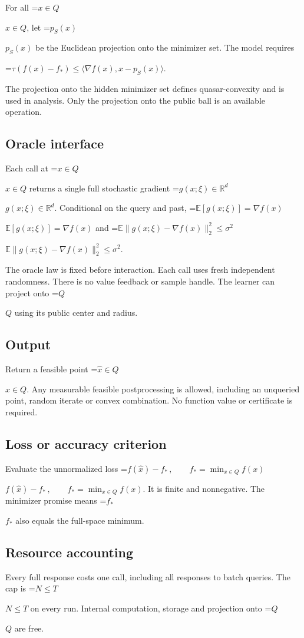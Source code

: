 \documentclass[10pt,a4paper]{article}
\newcommand{\AtlasMath}[1]{\par\begingroup\centering\setbox0=\hbox{$\displaystyle #1$}\ifdim\wd0>1.4\linewidth\typeout{ATLAS WIDE FORMULA: \the\wd0}\fi\ifdim\wd0>\linewidth\resizebox{\linewidth}{!}{\box0}\else\box0\fi\par\endgroup}
\newcommand{\AtlasInlineMath}[1]{\begingroup\setbox0=\hbox{$#1$}\ifdim\wd0>.4\linewidth\endgroup\AtlasMath{#1}\else\endgroup$#1$\fi}
\begin{document}
For all \AtlasInlineMath{x\in Q}, let \AtlasInlineMath{p_S(x)} be the Euclidean projection onto the minimizer set. The model requires


\AtlasMath{\tau(f(x)-f_*)\le \langle\nabla f(x),x-p_S(x)\rangle.}


The projection onto the hidden minimizer set defines quasar-convexity and is used in analysis. Only the projection onto the public ball is an available operation.

\subsection{Oracle interface}
Each call at \AtlasInlineMath{x\in Q} returns a single full stochastic gradient \AtlasInlineMath{g(x;\xi)\in\mathbb R^d}. Conditional on the query and past, \AtlasInlineMath{\mathbb E[g(x;\xi)]=\nabla f(x)} and \AtlasInlineMath{\mathbb E\|g(x;\xi)-\nabla f(x)\|_2^2\le\sigma^2}.

The oracle law is fixed before interaction. Each call uses fresh independent randomness. There is no value feedback or sample handle. The learner can project onto \AtlasInlineMath{Q} using its public center and radius.

\subsection{Output}
Return a feasible point \AtlasInlineMath{\widehat x\in Q}. Any measurable feasible postprocessing is allowed, including an unqueried point, random iterate or convex combination. No function value or certificate is required.

\subsection{Loss or accuracy criterion}
Evaluate the unnormalized loss \AtlasInlineMath{f(\widehat x)-f_*\,,\qquad f_*=\min_{x\in Q} f(x)}. It is finite and nonnegative. The minimizer promise means \AtlasInlineMath{f_*} also equals the full-space minimum.

\subsection{Resource accounting}
Every full response costs one call, including all responses to batch queries. The cap is \AtlasInlineMath{N\le T} on every run. Internal computation, storage and projection onto \AtlasInlineMath{Q} are free.
\end{document}
